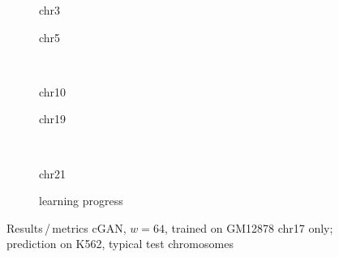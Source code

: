 \begin{figure}[p] %
    \begin{subfigure}{0.45\textwidth}
        \scriptsize
        \caption{chr3}
    \end{subfigure} \hfill
    \begin{subfigure}{0.45\textwidth}
        \scriptsize
        \caption{chr5}
    \end{subfigure}\\[5mm]
    \begin{subfigure}{0.45\textwidth}
        \scriptsize
        \caption{chr10}
    \end{subfigure}\hfill
    \begin{subfigure}{0.45\textwidth}
        \scriptsize
        \caption{chr19}
    \end{subfigure}\\[3mm]
    \centering
    \begin{subfigure}{0.45\textwidth}
        \scriptsize
        \caption{chr21}
    \end{subfigure} \hfill
    \begin{subfigure}{0.45\textwidth}
        \scriptsize
        \caption{learning progress} \label{fig:appendix:GAN64-17single_lossEpochs}
    \end{subfigure}
    \caption{Results\,/\,metrics cGAN, $w=64$, trained on GM12878 chr17 only; prediction on K562, typical test chromosomes}   \label{fig:appendix:GAN64-17single_pearson}
\end{figure}
